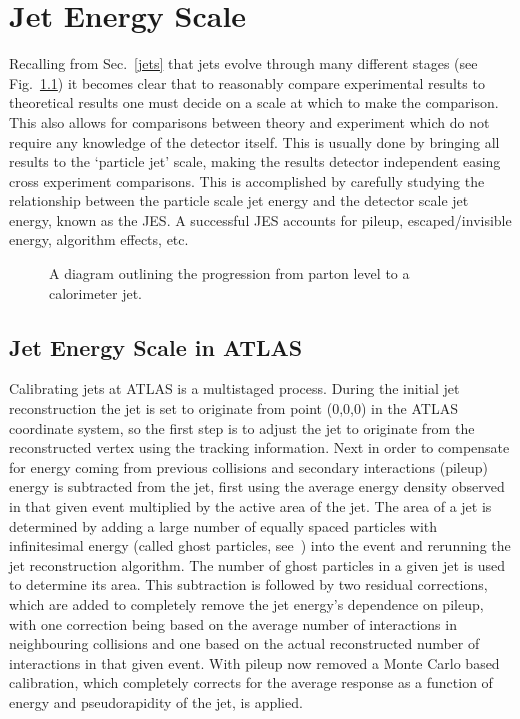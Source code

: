 \chapter{Jet Energy Scale}
\label{JES}

Recalling from Sec.~\ref{jets} that jets evolve through many different stages (see Fig.~\ref{JetLevelsFig}) it becomes clear that to reasonably compare experimental results to theoretical results one must decide on a scale at which to make the comparison.  
This also allows for comparisons between theory and experiment which do not require any knowledge of the detector itself.  
This is usually done by bringing all results to the `particle jet' scale, making the results detector independent easing cross experiment comparisons.  
This is accomplished by carefully studying the relationship between the particle scale jet energy and the detector scale jet energy, known as the \gls{JES}.   
A successful \gls{JES} accounts for pileup, escaped/invisible energy, algorithm effects, etc.  


\begin{figure}[!ht]
  \begin{center}
  \end{center}
  \caption[Jet showering evolution.]
      {\small A diagram outlining the progression from parton level to a calorimeter jet.}
  \label{JetLevelsFig}
\end{figure}

\section{Jet Energy Scale in ATLAS}
\label{ATLASJES}

Calibrating jets at ATLAS is a multistaged process.  
During the initial jet reconstruction the jet is set to originate from point (0,0,0) in the ATLAS coordinate system, so the first step is to adjust the jet to originate from the reconstructed vertex using the tracking information.  
Next in order to compensate for energy coming from previous collisions and secondary interactions (pileup) energy is subtracted from the jet, first using the average energy density observed in that given event multiplied by the active area of the jet.  
The area of a jet is determined by adding a large number of equally spaced particles with infinitesimal energy (called ghost particles, see~\cite{Soyez:2012hv}) into the event and rerunning the jet reconstruction algorithm.  
The number of ghost particles in a given jet is used to determine its area.  
This subtraction is followed by two residual corrections, which are added to completely remove the jet energy's dependence on pileup, with one correction being  based on the average number of interactions in neighbouring collisions and one based on the actual reconstructed number of interactions in that given event.    
With pileup now removed a Monte Carlo based calibration, which completely corrects for the average response as a function of energy and pseudorapidity of the jet, is applied.  

